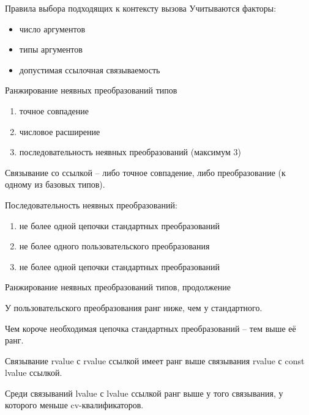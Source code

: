 \documentclass[unknownkeysallowed,xcolor=table]{beamer}
\begin{document}
\begin{frame}{Правила выбора подходящих к контексту вызова}
Учитываются факторы:

\vspace{1em}

\begin{itemize}
  \item число аргументов \vspace{1em}
  \item типы аргументов \vspace{1em}
  \item допустимая ссылочная связываемость
\end{itemize}
\end{frame}

\begin{frame}{Ранжирование неявных преобразований типов}

\begin{enumerate}
  \item точное совпадение
  \item числовое расширение
  \item последовательность неявных преобразований (максимум 3)
\end{enumerate}

\vspace{2em}

Связывание со ссылкой -- либо точное совпадение, либо преобразование (к одному из базовых типов).

\vspace{2em}

Последовательность неявных преобразований:
\begin{enumerate}
  \item не более одной цепочки стандартных преобразований
  \item не более одного пользовательского преобразования
  \item не более одной цепочки стандартных преобразований
\end{enumerate}

\end{frame}

\begin{frame}{Ранжирование неявных преобразований типов, продолжение}

У пользовательского преобразования ранг ниже, чем у стандартного.

\vspace{1em}

Чем короче необходимая цепочка стандартных преобразований -- тем выше её ранг.

\vspace{1em}

Связывание rvalue с rvalue ссылкой имеет ранг выше связывания rvalue с const lvalue ссылкой.

\vspace{1em}

Среди связываний lvalue с lvalue ссылкой ранг выше у того связывания, у которого меньше cv-квалификаторов.

\end{frame}
\end{document}

